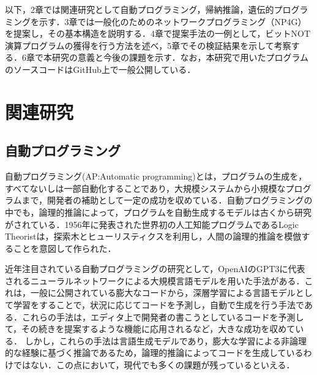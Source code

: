 \documentclass[exploratorypaper]{jsaiart} %
\begin{document}
以下，2章では関連研究として自動プログラミング，帰納推論，遺伝的プログラミングを示す．3章では一般化のためのネットワークプログラミング（NP4G）を提案し，その基本構造を説明する．4章で提案手法の一例として，ビットNOT演算プログラムの獲得を行う方法を述べ，5章でその検証結果を示して考察する．6章で本研究の意義と今後の課題を示す．なお，本研究で用いたプログラムのソースコードはGitHub上で一般公開している\footnotemark[1]．




\section{関連研究}
\subsection{自動プログラミング}
自動プログラミング(AP:Automatic programming)とは，プログラムの生成を，すべてないしは一部自動化することであり，大規模システムから小規模なプログラムまで，開発者の補助として一定の成功を収めている\cite{AutomaticProgramming}．自動プログラミングの中でも，論理的推論によって，プログラムを自動生成するモデルは古くから研究がされている．1956年に発表された世界初の人工知能プログラムであるLogic Theoristは，探索木とヒューリスティクスを利用し，人間の論理的推論を模倣することを意図して作られた\cite{LogicTheorist}．

近年注目されている自動プログラミングの研究として，OpenAIのGPT3\cite{gpt3}に代表されるニューラルネットワークによる大規模言語モデルを用いた手法がある．これは，一般に公開されている膨大なコードから，深層学習による言語モデルとして学習をすることで，状況に応じてコードを予測し，自動で生成を行う手法である．これらの手法は，エディタ上で開発者の書こうとしているコードを予測して，その続きを提案するような機能に応用されるなど，大きな成功を収めている\cite{copilot}．
しかし，これらの手法は言語生成モデルであり，膨大な学習による非論理的な経験に基づく推論であるため，論理的推論によってコードを生成しているわけではない．この点において，現代でも多くの課題が残っているといえる．
\end{document}
